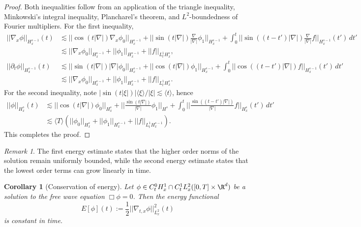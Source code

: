 \documentclass[reqno]{amsart}
\newtheorem{corollary}[theorem]{Corollary}
\theoremstyle{definition}
\theoremstyle{remark}
\newtheorem*{remark}{Remark}
\begin{document}
\begin{proof}
	Both inequalities follow from an application of the triangle inequality, Minkowski's integral inequality, Plancharel's theorem, and $L^2$-boundedness of Fourier multipliers. For the first inequality, 
		\begin{align*} 
			||\nabla_x \phi||_{H^{s - 1}_x} (t)
				&\lesssim || \cos(t |\nabla|)  \nabla_x\phi_0||_{H^{s - 1}_x} + || \sin(t |\nabla|)\frac{\nabla}{|\nabla|} \phi_1 ||_{H^{s - 1}_x} + \int_0^t || \sin((t - t') |\nabla|) \frac{\nabla}{|\nabla|} f ||_{H^{s - 1}_x} (t') \, d t' \\
				&\lesssim || \nabla_x \phi_0||_{H^{s - 1}_x} + ||\phi_1||_{H^{s - 1}_x} + || f||_{L^1_t H^s_x}, \\
			||\partial_t \phi||_{H^{s - 1}_x} (t)
				&\lesssim ||\sin(t |\nabla|) |\nabla| \phi_0 ||_{H^{s - 1}_x} + ||\cos (t |\nabla|) \phi_1||_{H^{s - 1}_x} + \int_0^t ||\cos((t - t') |\nabla|) f||_{H^{s - 1}_x} (t') \, dt' \\
				&\lesssim || \nabla_x \phi_0||_{H^{s - 1}_x} + ||\phi_1||_{H^{s - 1}_x} + || f||_{L^1_t H^s_x}.
		\end{align*}
	For the second inequality, note $|\sin(t |\xi|)| \langle \xi \rangle /|\xi| \lesssim \langle t \rangle$, hence
		\begin{align*}
			||\phi||_{H^s_x} (t)
				&\lesssim  || \cos(t |\nabla|)  \phi_0||_{H^{s}_x} + || \frac{\sin(t |\nabla|)}{|\nabla|} \phi_1 ||_{H^{s}} + \int_0^t ||  \frac{\sin((t - t') |\nabla|)}{|\nabla|} f ||_{H^{s}_x} (t') \, d t' \\
				&\lesssim \langle T \rangle \left(|| \phi_0||_{H^{s}_x} + ||\phi_1||_{H^{s - 1}_x} + ||f||_{L^1_t H^{s - 1}_x}	\right).
		\end{align*}	
	This completes the proof.	
\end{proof}

\begin{remark}
	The first energy estimate states that the higher order norms of the solution remain uniformly bounded, while the second energy estimate states that the lowest order terms can grow linearly in time. 
\end{remark}

\begin{corollary}[Conservation of energy]
	Let $\phi \in C_t^0 H^1_x \cap C_t^1 L^2_x ([0, T] \times \R^d)$ be a solution to the free wave equation $\Box \phi = 0$. Then the energy functional
		\[ E[\phi] (t) := \frac12 ||\nabla_{t, x} \phi||_{L^2_{x}}^2 (t)  \]
	is constant in time. \label{cor:conserve}
\end{corollary}
\end{document}
